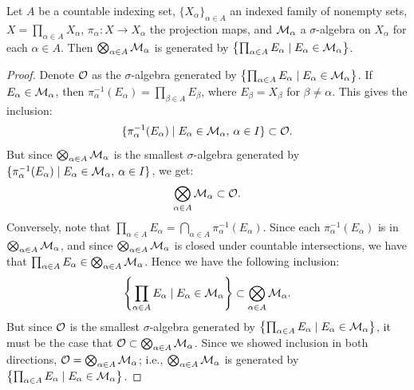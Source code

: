     \begin{proposition}
        Let $A$ be a countable indexing set, $\{X_\alpha\}_{\alpha \in A}$ an indexed family of nonempty sets, $X = \prod_{\alpha \in A}X_\alpha$, $\pi_\alpha:X \rightarrow X_\alpha$ the projection maps, and $\cM_\alpha$ a $\sigma$-algebra on $X_\alpha$ for each $\alpha \in A$. Then $\bigotimes_{\alpha \in A}\cM_\alpha$ is generated by $\left\{ \prod_{\alpha \in A}E_\alpha \mid E_\alpha \in \cM_\alpha \right\}$.
    \end{proposition}
        \begin{proof}
            Denote $\cO$ as the $\sigma$-algebra generated by $\left\{ \prod_{\alpha \in A}E_\alpha \mid E_\alpha \in \cM_\alpha \right\}$.
            If $E_\alpha \in \cM_\alpha$, then $\pi_\alpha^{-1}(E_\alpha) = \prod_{\beta \in A}E_\beta$, where $E_\beta = X_\beta$ for $\beta \neq \alpha$. This gives the inclusion:
                \begin{equation*}
                \begin{split}
                    \{\pi_\alpha^{-1}(E_\alpha) \mid E_\alpha \in \cM_\alpha, \h2 \alpha \in I\} \subset \cO.
                \end{split}
                \end{equation*}
            But since $\bigotimes_{\alpha \in A}\cM_\alpha$ is the smallest $\sigma$-algebra generated by $\{\pi_\alpha^{-1}(E_\alpha) \mid E_\alpha \in \cM_\alpha, \h2 \alpha \in I\}$, we get: 
                \begin{equation*}
                \begin{split}
                    \bigotimes_{\alpha \in A}\cM_\alpha \subset \cO.
                \end{split}
                \end{equation*}
            Conversely, note that $\prod_{\alpha \in A}E_\alpha = \bigcap_{\alpha \in A}\pi_\alpha^{-1}(E_\alpha)$. Since each $\pi_\alpha^{-1}(E_\alpha)$ is in $\bigotimes_{\alpha \in A}\cM_\alpha$, and since $\bigotimes_{\alpha \in A}\cM_\alpha$ is closed under countable intersections, we have that $\prod_{\alpha \in A}E_\alpha \in \bigotimes_{\alpha \in A}\cM_\alpha$. Hence we have the following inclusion:
                \begin{equation*}
                \begin{split}
                    \left\{ \prod_{\alpha \in A}E_\alpha \mid E_\alpha \in \cM_\alpha \right\} \subset \bigotimes_{\alpha \in A}\cM_\alpha.
                \end{split}
                \end{equation*}
            But since $\cO$ is the smallest $\sigma$-algebra generated by $\left\{ \prod_{\alpha \in A}E_\alpha \mid E_\alpha \in \cM_\alpha \right\}$, it must be the case that $\cO \subset \bigotimes_{\alpha \in A}\cM_\alpha$. Since we showed inclusion in both directions, $\cO = \bigotimes_{\alpha \in A}\cM_\alpha$; i.e., $\bigotimes_{\alpha \in A}\cM_\alpha$ is generated by $\left\{ \prod_{\alpha \in A}E_\alpha \mid E_\alpha \in \cM_\alpha \right\}$.
        \end{proof}

